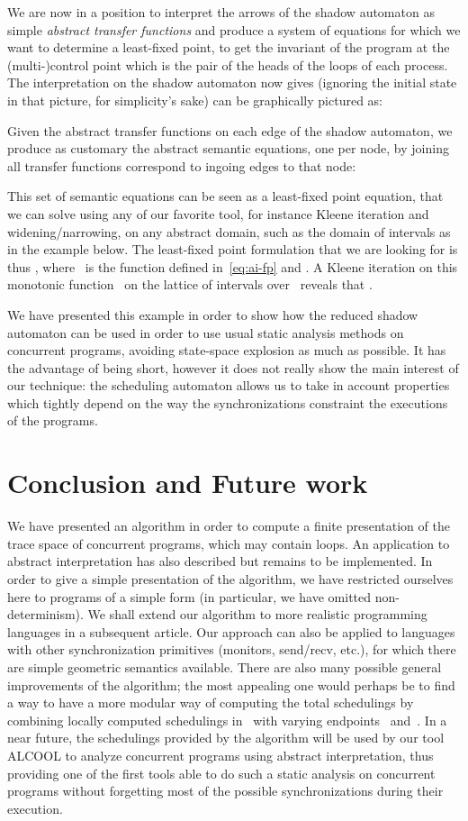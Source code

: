 \documentclass[orivec]{llncs} \usepackage[T1]{fontenc}
\begin{document}
We are now in a position to interpret the arrows of the shadow automaton as
simple \emph{abstract transfer functions} and produce a system of equations for
which we want to determine a least-fixed point, to get the invariant of the
program at the (multi-)control point which is the pair of the heads of the loops
of each process.
The interpretation on the shadow automaton now gives (ignoring the initial state  in that picture, for
simplicity's sake) can be graphically pictured as:

Given the abstract transfer functions on each edge of the shadow automaton,
we produce as customary the abstract semantic equations, one per node, by
joining all transfer functions correspond to ingoing edges to that node:

This set of semantic equations can be seen as a least-fixed point equation, that
we can solve using any of our favorite tool, for instance Kleene iteration and
widening/narrowing, on any abstract domain, such as the domain of intervals as
in the example below.
The least-fixed point formulation that we are looking for is thus , where~ is the function defined in~\eqref{eq:ai-fp} and
.
A Kleene iteration on this monotonic function~ on the lattice of intervals
over~ reveals that .

We have presented this example in order to show how the reduced shadow automaton
can be used in order to use usual static analysis methods on concurrent
programs, avoiding state-space explosion as much as possible. It has the
advantage of being short, however it does not really show the main interest of
our technique: the scheduling automaton allows us to take in account properties
which tightly depend on the way the synchronizations constraint the executions
of the programs.

\section{Conclusion and Future work}
\label{concl}
We have presented an algorithm in order to compute a finite presentation of the
trace space of concurrent programs, which may contain loops. An application to
abstract interpretation has also described but remains to be implemented. In
order to give a simple presentation of the algorithm, we have restricted
ourselves here to programs of a simple form (in particular, we have omitted
non-determinism). We shall extend our algorithm to more realistic programming
languages in a subsequent article. Our approach can also be applied to languages
with other synchronization primitives (monitors, send/recv, etc.), for which
there are simple geometric semantics available.  There are also many possible
general improvements of the algorithm; the most appealing one would perhaps be
to find a way to have a more modular way of computing the total schedulings by
combining locally computed schedulings in~ with varying
endpoints~ and~. In a near future, the schedulings provided by the
algorithm will be used by our tool ALCOOL to analyze concurrent programs using
abstract interpretation, thus providing one of the first tools able to do such a
static analysis on concurrent programs without forgetting most of the possible
synchronizations during their execution.
\end{document}
